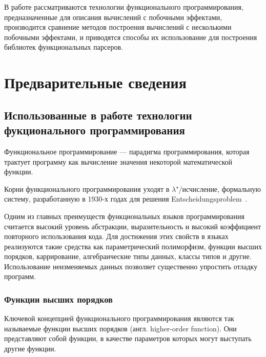 





\Intro
В работе рассматриваются технологии функционального программирования, 
предназначенные для описания вычислений с побочными эффектами, производится 
сравнение методов построения вычислений с несколькими побочными эффектами,
и приводятся способы их использование для построения библиотек функциональных 
парсеров.

\chapter{Предварительные сведения}

\section{Использованные в работе технологии фукционального программирования}

Функциональное программирование --- парадигма программирования, которая трактует 
программу как вычисление значения некоторой математической функции.

Корни функционального программирования уходят в $\lambda$"/исчисление, 
формальную систему, разработанную в 1930-х годах для решения 
Entscheidungsproblem~\autocite{Entscheidungsproblem}.

Одним из главных преимуществ функциональных языков программирования считается 
высокий уровень абстракции, выразительность и высокий коэффициент повторного 
использования кода. Для достижения этих свойств в языках реализуются такие 
средства как параметрический полиморфизм, функции высших порядков, каррирование, 
алгебраические типы данных, классы типов и другие. Использование неизменяемых 
данных позволяет существенно упростить отладку программ.

\subsection{Функции высших порядков}
Ключевой концепцией функционального программирования являются так называемые 
функции высших порядков (англ. higher-order function). Они представляют собой 
функции, в качестве параметров которых могут выступать другие функции.

